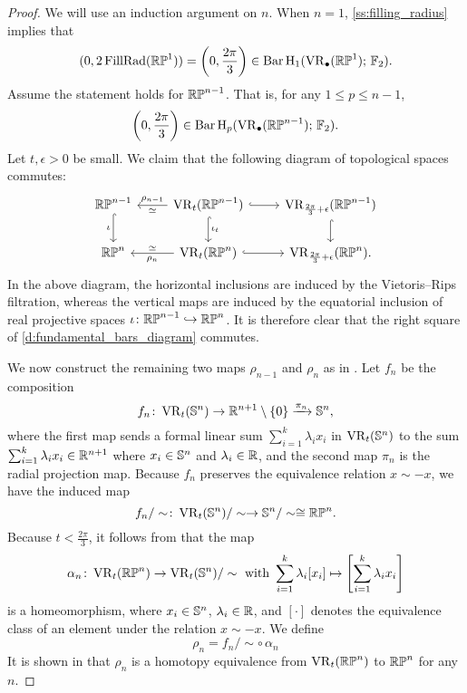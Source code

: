 \begin{proof}
	We will use an induction argument on $n$.
	When $n = 1$, \cref{ss:filling_radius} implies that
	\[
	(0, 2\operatorname{FillRad}(\mathbb{RP}^1)) = \left(0, \frac{2\pi}{3}\right) \in \operatorname{Bar} \operatorname{H}_{1}(\operatorname{VR}_\bullet(\mathbb{RP}^1);\,{\mathbb{F}_2}).
	\]
	Assume the statement holds for $\mathbb{RP}^{n-1}$.
	That is, for any $1 \leq p \leq n-1$,
	\[
	\left(0, \frac{2\pi}{3}\right) \in \operatorname{Bar} \operatorname{H}_{p}(\operatorname{VR}_\bullet(\mathbb{RP}^{n-1});\,{\mathbb{F}_2}).
	\]
	Let $t, \epsilon > 0$ be small.
	We claim that the following diagram of topological spaces commutes:
	\begin{equation}\label{d:fundamental_bars_diagram}
		\begin{tikzcd}
			\rp^{n-1}
			\ar[d, hook,"{\iota}" left]
			&
			\VR_t(\rp^{n-1})
			\ar[d, hook,"\iota_t"]
			\ar[l, "\rho_{n-1}" above, "\simeq" below]
			\ar[r, hook]
			&
			\VR_{\frac{2\pi}{3}+\epsilon}(\rp^{n-1})
			\ar[d, hook]
			\\
			\rp^{n}
			&
			\VR_t(\rp^{n})
			\ar[l, "\rho_n" below, "\simeq" above]
			\ar[r, hook]
			&
			\VR_{\frac{2\pi}{3}+\epsilon}(\rp^{n}).
		\end{tikzcd}
	\end{equation}
	In the above diagram, the horizontal inclusions are induced by the Vietoris--Rips filtration, whereas the vertical maps are induced by the equatorial inclusion of real projective spaces $\iota \colon \mathbb{RP}^{n-1} \hookrightarrow \mathbb{RP}^{n}$.
	It is therefore clear that the right square of \eqref{d:fundamental_bars_diagram} commutes.
	
	We now construct the remaining two maps $\rho_{n-1}$ and $\rho_{n}$ as in \cite[]{adams2022metric}.
	Let $f_n$ be the composition
	\[
	f_n \colon \operatorname{VR}_t(\mathbb{S}^n) \to \mathbb{R}^{n+1} \setminus \{0\} \xrightarrow{\pi_n} \mathbb{S}^{n},
	\]
	where the first map sends a formal linear sum $\sum_{i=1}^k \lambda_i x_i$ in $\operatorname{VR}_t(\mathbb{S}^n)$ to the sum $\sum_{i=1}^k \lambda_i x_i \in \mathbb{R}^{n+1}$ where $x_i \in \mathbb{S}^{n}$ and $\lambda_i \in \mathbb{R}$, and the second map $\pi_n$ is the radial projection map.
	Because $f_n$ preserves the equivalence relation $x \sim -x$, we have the induced map 
	\[
	f_n/\sim \colon \operatorname{VR}_t(\mathbb{S}^{n})/\sim\to \mathbb{S}^{n}/\sim\cong \mathbb{RP}^n.
	\]
	Because $t < \frac{2\pi}{3}$, it follows from \cite[Lemma 4.4]{adams2022metric} that the map
	\[
	\alpha_n \colon \operatorname{VR}_t(\mathbb{RP}^n) \to \operatorname{VR}_t(\mathbb{S}^n)/\sim \text{ with }
	\sum_{i=1}^k \lambda_i [x_i] \mapsto \left[\sum_{i=1}^k \lambda_i x_i\right]
	\]
	is a homeomorphism, where $x_i \in \mathbb{S}^{n}$, $\lambda_i \in \mathbb{R}$, and $[\cdot]$ denotes the equivalence class of an element under the relation $x \sim -x$.
	We define
	\[\rho_n = f_n/\sim \circ \,\alpha_n\]
	It is shown in \cite[Theorem 4.5]{adams2022metric} that $\rho_n$ is a homotopy equivalence from $\operatorname{VR}_t(\mathbb{RP}^n)$ to $\mathbb{RP}^n$ for any $n$.
	

\end{proof}
